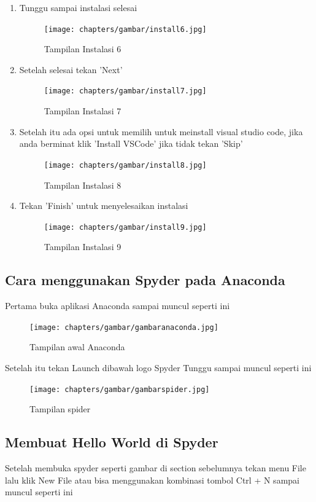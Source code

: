 \begin{enumerate}
  \item Tunggu sampai instalasi selesai
\begin{figure}[!htbp]
  \centering
  \texttt{[image: chapters/gambar/install6.jpg]}
  \caption{Tampilan Instalasi 6}
\end{figure}

  \item Setelah selesai tekan 'Next'
\begin{figure}[!htbp]
  \centering
  \texttt{[image: chapters/gambar/install7.jpg]}
  \caption{Tampilan Instalasi 7}
\end{figure}

  \item Setelah itu ada opsi untuk memilih untuk meinstall visual studio code, jika anda berminat klik 'Install VSCode' jika tidak tekan 'Skip'
\begin{figure}[!htbp]
  \centering
  \texttt{[image: chapters/gambar/install8.jpg]}
  \caption{Tampilan Instalasi 8}
\end{figure}

  \item Tekan 'Finish' untuk menyelesaikan instalasi
\begin{figure}[!htbp]
  \centering
  \texttt{[image: chapters/gambar/install9.jpg]}
  \caption{Tampilan Instalasi 9}
\end{figure}

\end{enumerate}

\subsection{Cara menggunakan Spyder pada Anaconda}
Pertama buka aplikasi Anaconda sampai muncul seperti ini
\begin{figure}[!htbp]
  \centering
  \texttt{[image: chapters/gambar/gambaranaconda.jpg]}
  \caption{Tampilan awal Anaconda}
\end{figure}

Setelah itu tekan Launch dibawah logo Spyder
Tunggu sampai muncul seperti ini
\begin{figure}[!htbp]
  \centering
  \texttt{[image: chapters/gambar/gambarspider.jpg]}
  \caption{Tampilan spider}
\end{figure}

\subsection{Membuat Hello World di Spyder}
Setelah membuka spyder seperti gambar di section sebelumnya tekan menu File lalu klik New File atau bisa menggunakan kombinasi tombol Ctrl + N sampai muncul seperti ini

